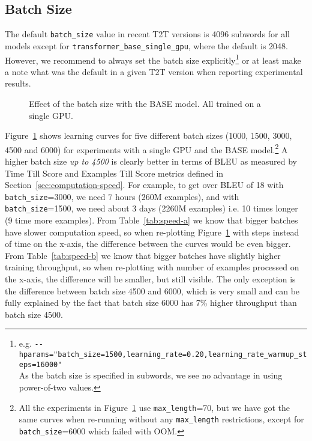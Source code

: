\documentclass{pbmlarxiv} \pdfoutput=1
\def\Sref#1{Section~\ref{#1}}
\def\Tref#1{Table~\ref{#1}}
\def\Fref#1{Figure~\ref{#1}}
\begin{document}
\subsection{Batch Size}\label{sec:batch-size}
The default \verb|batch_size| value in recent T2T versions is 4096 subwords for all models
 except for \verb|transformer_base_single_gpu|, where the default is 2048.
However, we recommend to always set the batch size explicitly\cprotect\footnote{ %
  e.g. \scriptsize\verb|--hparams="batch_size=1500,learning_rate=0.20,learning_rate_warmup_steps=16000"|\\
  As the batch size is specified in subwords, we see no advantage in using power-of-two values.
 }
 or at least make a note what was the default in a given T2T version when reporting experimental results.


\begin{figure}
\vspace{-5mm}
\caption{Effect of the batch size with the BASE model. All trained on a single GPU.}
\label{fig:base-batch-size}
\end{figure}

Figure~\ref{fig:base-batch-size} shows learning curves for five different batch sizes
 (1000, 1500, 3000, 4500 and 6000) for experiments with a single GPU and the BASE model.\cprotect\footnote{All
   the experiments in \Fref{fig:base-batch-size} use \verb|max_length|=70,
   but we have got the same curves when re-running without any \verb|max_length| restrictions,
   except for \verb|batch_size|=6000 which failed with OOM.
 } 
A higher batch size \emph{up to 4500} is clearly better in terms of BLEU 
 as measured by Time Till Score
 and Examples Till Score metrics defined in \Sref{sec:computation-speed}.
For example, to get over BLEU of 18
 with \verb|batch_size|=3000, we need 7 hours (260M examples),
 and with \verb|batch_size|=1500, we need about 3 days (2260M examples)
 i.e. 10 times longer (9 time more examples).
From \Tref{tab:speed-a} we know that bigger batches have slower computation speed,
 so when re-plotting \Fref{fig:base-batch-size} with steps instead of time on the x-axis,
 the difference between the curves would be even bigger.
From \Tref{tab:speed-b} we know that bigger batches have slightly higher training throughput,
 so when re-plotting with number of examples processed on the x-axis,
 the difference will be smaller, but still visible.
The only exception is the difference between batch size 4500 and 6000,
 which is very small and can be fully explained by the fact
 that batch size 6000 has 7\% higher throughput than batch size 4500.
\end{document}
